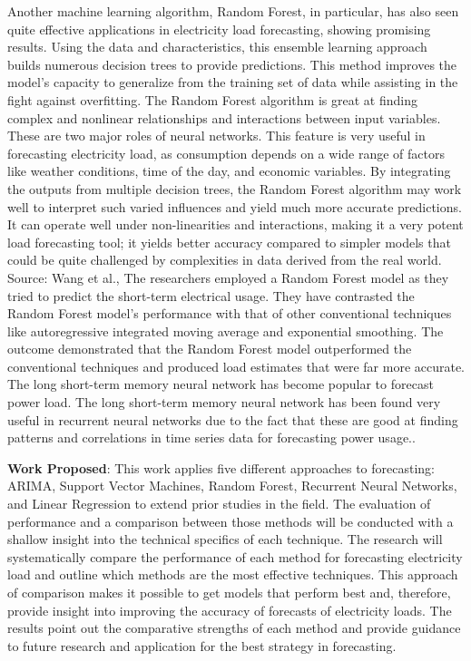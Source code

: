 \documentclass[12pt, a4paper,twoside]{report}
\theoremstyle{plain} %
\theoremstyle{definition} %
\theoremstyle{remark} %
\numberwithin{equation}{chapter}
\begin{document}
Another machine learning algorithm, Random Forest, in particular, has also seen quite effective applications in electricity load forecasting, showing promising results. Using the data and characteristics, this ensemble learning approach builds numerous decision trees to provide predictions. This method improves the model's capacity to generalize from the training set of data while assisting in the fight against overfitting. The Random Forest algorithm is great at finding complex and nonlinear relationships and interactions between input variables. These are two major roles of neural networks. This feature is very useful in forecasting electricity load, as consumption depends on a wide range of factors like weather conditions, time of the day, and economic variables. By integrating the outputs from multiple decision trees, the Random Forest algorithm may work well to interpret such varied influences and yield much more accurate predictions. It can operate well under non-linearities and interactions, making it a very potent load forecasting tool; it yields better accuracy compared to simpler models that could be quite challenged by complexities in data derived from the real world. Source: Wang et al., The researchers employed a Random Forest model as they tried to predict the short-term electrical usage. They have contrasted the Random Forest model's performance with that of other conventional techniques like autoregressive integrated moving average and exponential smoothing. The outcome demonstrated that the Random Forest model outperformed the conventional techniques and produced load estimates that were far more accurate.\cite{wang2023comparative}
The long short-term memory neural network has become popular to forecast power load. The long short-term memory neural network has been found very useful in recurrent neural networks due to the fact that these are good at finding patterns and correlations in time series data for forecasting power usage.\cite{wang2023ceemdan}.


\textbf{Work Proposed}:   
\newline
This work applies five different approaches to forecasting: ARIMA, Support Vector Machines, Random Forest, Recurrent Neural Networks, and Linear Regression to extend prior studies in the field. The evaluation of performance and a comparison between those methods will be conducted with a shallow insight into the technical specifics of each technique. The research will systematically compare the performance of each method for forecasting electricity load and outline which methods are the most effective techniques. This approach of comparison makes it possible to get models that perform best and, therefore, provide insight into improving the accuracy of forecasts of electricity loads. The results point out the comparative strengths of each method and provide guidance to future research and application for the best strategy in forecasting. 
\end{document}
